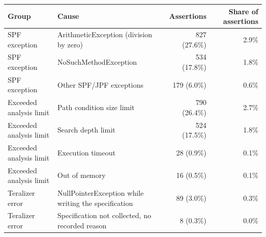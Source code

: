   \renewcommand{\theHreporttablerow}{tab-exclusions-spf-causes.\arabic{reporttablerow}}
  \setcounter{reporttablerow}{0}
  \begin{tabular}{llrr}
  \toprule
  Group & Cause & \multicolumn{1}{c}{Assertions} & Share of assertions \\
  \midrule
  {reporttablerow}\label{tabrow:tab-exclusions-spf-causes:SPF@20exception@3AArithmeticException@20@28division@20by@20zero@29}SPF exception & ArithmeticException (division by zero) & 827\; (27.6\%) & 2.9\% \\
  {reporttablerow}\label{tabrow:tab-exclusions-spf-causes:SPF@20exception@3ANoSuchMethodException}SPF exception & NoSuchMethodException & 534\; (17.8\%) & 1.8\% \\
  {reporttablerow}\label{tabrow:tab-exclusions-spf-causes:SPF@20exception@3AOther@20SPF@2FJPF@20exceptions}SPF exception & Other SPF/JPF exceptions & 179\; (\phantom{0}6.0\%) & 0.6\% \\
  \midrule
  {reporttablerow}\label{tabrow:tab-exclusions-spf-causes:Exceeded@20analysis@20limit@3APath@20condition@20size@20limit}Exceeded analysis limit & Path condition size limit & 790\; (26.4\%) & 2.7\% \\
  {reporttablerow}\label{tabrow:tab-exclusions-spf-causes:Exceeded@20analysis@20limit@3ASearch@20depth@20limit}Exceeded analysis limit & Search depth limit & 524\; (17.5\%) & 1.8\% \\
  {reporttablerow}\label{tabrow:tab-exclusions-spf-causes:Exceeded@20analysis@20limit@3AExecution@20timeout}Exceeded analysis limit & Execution timeout & 28\; (\phantom{0}0.9\%) & 0.1\% \\
  {reporttablerow}\label{tabrow:tab-exclusions-spf-causes:Exceeded@20analysis@20limit@3AOut@20of@20memory}Exceeded analysis limit & Out of memory & 16\; (\phantom{0}0.5\%) & 0.1\% \\
  \midrule
  {reporttablerow}\label{tabrow:tab-exclusions-spf-causes:Teralizer@20error@3ANullPointerException@20while@20writing@20the@20specification}Teralizer error & NullPointerException while writing the specification & 89\; (\phantom{0}3.0\%) & 0.3\% \\
  {reporttablerow}\label{tabrow:tab-exclusions-spf-causes:Teralizer@20error@3ASpecification@20not@20collected@2C@20no@20recorded@20reason}Teralizer error & Specification not collected, no recorded reason & 8\; (\phantom{0}0.3\%) & 0.0\% \\
  \bottomrule
  \end{tabular}
